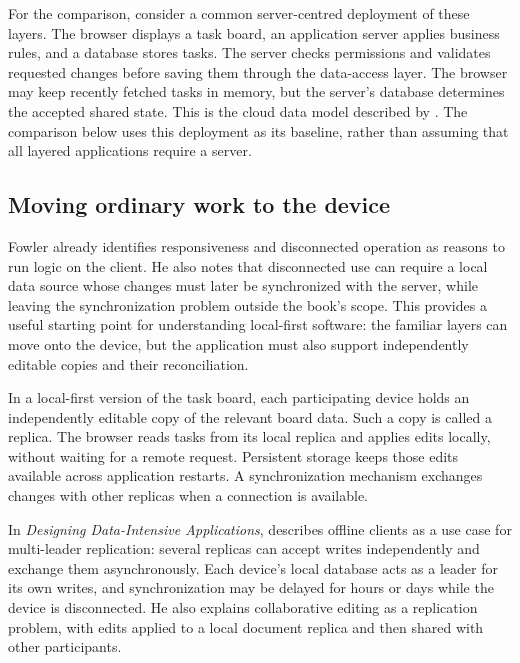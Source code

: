 For the comparison, consider a common server-centred deployment of these layers.
The browser displays a task board, an application server applies business rules, and a database stores tasks.
The server checks permissions and validates requested changes before saving them through the data-access layer.
The browser may keep recently fetched tasks in memory, but the server's database determines the accepted shared state.
This is the cloud data model described by \textcite{local-first-software}.
The comparison below uses this deployment as its baseline, rather than assuming that all layered applications require a server.

\subsection{Moving ordinary work to the device}

Fowler already identifies responsiveness and disconnected operation as reasons to run logic on the client.
He also notes that disconnected use can require a local data source whose changes must later be synchronized with the server, while leaving the synchronization problem outside the book's scope.
This provides a useful starting point for understanding local-first software: the familiar layers can move onto the device, but the application must also support independently editable copies and their reconciliation.
\parencite[23--24]{patterns-of-enterprise-application-architecture}

In a local-first version of the task board, each participating device holds an independently editable copy of the relevant board data.
Such a copy is called a replica.
The browser reads tasks from its local replica and applies edits locally, without waiting for a remote request.
Persistent storage keeps those edits available across application restarts.
A synchronization mechanism exchanges changes with other replicas when a connection is available.
\parencite{local-first-software}

In \emph{Designing Data-Intensive Applications}, \textcite[Chapter~5]{designing-data-intensive-applications} describes offline clients as a use case for multi-leader replication: several replicas can accept writes independently and exchange them asynchronously.
Each device's local database acts as a leader for its own writes, and synchronization may be delayed for hours or days while the device is disconnected.
He also explains collaborative editing as a replication problem, with edits applied to a local document replica and then shared with other participants.

